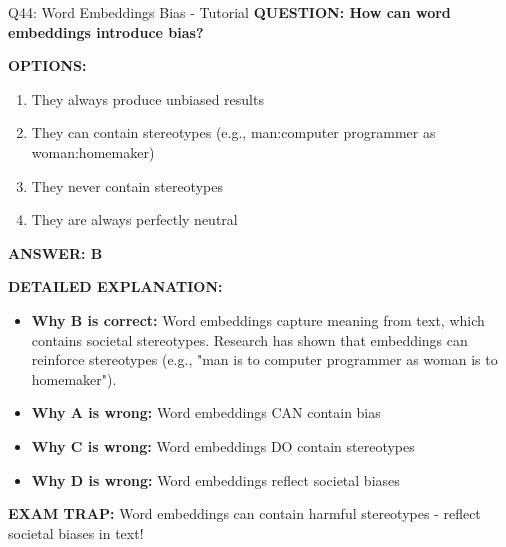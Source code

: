 \documentclass[8pt]{beamer}
\begin{document}
	\begin{frame}{Q44: Word Embeddings Bias - Tutorial}
		\fontsize{6.5}{7.5}\selectfont
		\textbf{QUESTION: How can word embeddings introduce bias?}
		
		\vspace{0.1cm}
		\textbf{OPTIONS:}
		\begin{enumerate}
			\item They always produce unbiased results
			\item They can contain stereotypes (e.g., man:computer programmer as woman:homemaker)
			\item They never contain stereotypes
			\item They are always perfectly neutral
		\end{enumerate}
		
		\vspace{0.1cm}
		\textcolor{myblue}{\textbf{ANSWER: B}}
		
		\vspace{0.1cm}
		\textbf{DETAILED EXPLANATION:}
		\begin{itemize}
			\item \textbf{Why B is correct:} Word embeddings capture meaning from text, which contains societal stereotypes. Research has shown that embeddings can reinforce stereotypes (e.g., "man is to computer programmer as woman is to homemaker").
			\item \textbf{Why A is wrong:} Word embeddings CAN contain bias
			\item \textbf{Why C is wrong:} Word embeddings DO contain stereotypes
			\item \textbf{Why D is wrong:} Word embeddings reflect societal biases
		\end{itemize}
		
		\textcolor{myred}{\textbf{EXAM TRAP:}} Word embeddings can contain \textcolor{myblue}{harmful stereotypes} - reflect societal biases in text!
	\end{frame}
	
\end{document}
